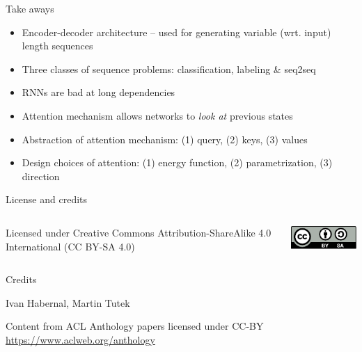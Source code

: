 \documentclass[12pt,aspectratio=169,handout]{beamer}
\begin{document}
\begin{frame}{Take aways}
	
\begin{itemize}
	\item Encoder-decoder architecture -- used for generating variable (wrt. input) length sequences
	\item Three classes of sequence problems: classification, labeling \& seq2seq
	\item RNNs are bad at long dependencies
	\item Attention mechanism allows networks to \textit{look at} previous states
	\item Abstraction of attention mechanism: (1) query, (2) keys, (3) values
	\item Design choices of attention: (1) energy function, (2) parametrization, (3) direction
\end{itemize}
	
\end{frame}



\begin{frame}{License and credits}

	\begin{columns}
		\begin{column}{0.7\textwidth}
			Licensed under Creative Commons Attribution-ShareAlike 4.0 International (CC BY-SA 4.0)
		\end{column}
		\begin{column}{0.2\textwidth}
			\includegraphics[width=0.9\linewidth]{img/cc-by-sa-icon.pdf}
		\end{column}
	\end{columns}
	
	\bigskip
	
	Credits
	
	\begin{scriptsize}
		
		Ivan Habernal, Martin Tutek
		
		Content from ACL Anthology papers licensed under CC-BY \url{https://www.aclweb.org/anthology}
		
	
	\end{scriptsize}
	
\end{frame}
\end{document}
